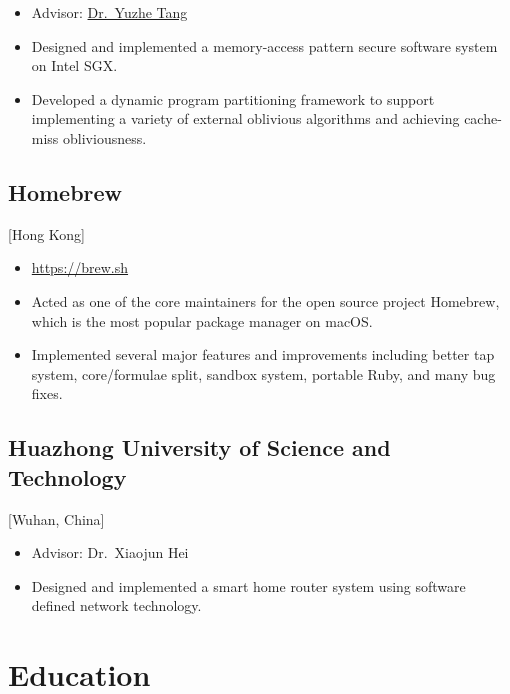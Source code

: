 \documentclass{mycv}
\begin{document}
\begin{itemize}
  \item Advisor: \href{https://tristartom.github.io}{Dr.~Yuzhe Tang}
  \item Designed and implemented a memory-access pattern secure software system on Intel SGX\@.
  \item Developed a dynamic program partitioning framework to support implementing a variety of external oblivious algorithms and achieving cache-miss obliviousness.
\end{itemize}

\subsection{Homebrew}[Hong Kong]
\begin{positions}
\end{positions}

\begin{itemize}
  \item \url{https://brew.sh}
  \item Acted as one of the core maintainers for the open source project Homebrew, which is the most popular package manager on macOS\@.
  \item Implemented several major features and improvements including better tap system, core/formulae split, sandbox system, portable Ruby, and many bug fixes.
\end{itemize}

\subsection{Huazhong University of Science and Technology}[Wuhan, China]
\begin{positions}
\end{positions}

\begin{itemize}
  \item Advisor: Dr.~Xiaojun Hei
  \item Designed and implemented a smart home router system using software defined network technology.
\end{itemize}

\section{Education}
\end{document}
